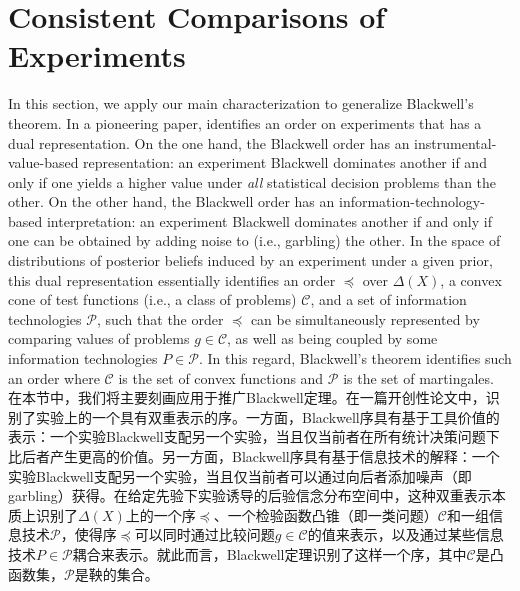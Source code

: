 \documentclass[12pt,letterpaper]{article}
\newenvironment{original}{\color{black}}{}
\newenvironment{translation}{\color{blue}}{}
\theoremstyle{plain}
\theoremstyle{definition}
\theoremstyle{remark}
\newcommand{\Pc}{\mathcal{P}}
\newcommand{\C}{\mathcal{C}}
\theoremstyle{definition}
\begin{document}
\section{Consistent Comparisons of Experiments}\label{sec:compare}
\begin{original}
In this section, we apply our main characterization to generalize Blackwell's theorem. In a pioneering paper, \citet{Blackwell1951Comparison} identifies an order on experiments that has a dual representation. On the one hand, the Blackwell order has an instrumental-value-based representation: an experiment Blackwell dominates another if and only if one yields a higher value under \emph{all} statistical decision problems than the other. On the other hand, the Blackwell order has an information-technology-based interpretation: an experiment Blackwell dominates another if and only if one can be obtained by adding noise to (i.e., garbling) the other. In the space of distributions of posterior beliefs induced by an experiment under a given prior, this dual representation essentially identifies an order $\preceq$ over $\Delta(X)$, a convex cone of test functions (i.e., a class of problems) $\C$, and a set of information technologies $\Pc$, such that the order $\preceq$ can be simultaneously represented by comparing values of problems $g \in \C$, as well as being coupled by some information technologies $P \in \Pc$. In this regard, Blackwell's theorem identifies such an order where $\C$ is the set of convex functions and $\Pc$ is the set of martingales.
\end{original}
\begin{translation}
在本节中，我们将主要刻画应用于推广Blackwell定理。在一篇开创性论文中，\citet{Blackwell1951Comparison}识别了实验上的一个具有双重表示的序。一方面，Blackwell序具有基于工具价值的表示：一个实验Blackwell支配另一个实验，当且仅当前者在所有统计决策问题下比后者产生更高的价值。另一方面，Blackwell序具有基于信息技术的解释：一个实验Blackwell支配另一个实验，当且仅当前者可以通过向后者添加噪声（即garbling）获得。在给定先验下实验诱导的后验信念分布空间中，这种双重表示本质上识别了$\Delta(X)$上的一个序$\preceq$、一个检验函数凸锥（即一类问题）$\C$和一组信息技术$\Pc$，使得序$\preceq$可以同时通过比较问题$g \in \C$的值来表示，以及通过某些信息技术$P \in \Pc$耦合来表示。就此而言，Blackwell定理识别了这样一个序，其中$\C$是凸函数集，$\Pc$是鞅的集合。
\end{translation}
\end{document}
